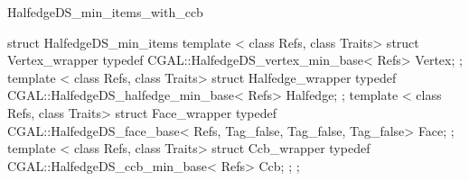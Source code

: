 \begin{ccRefClass}{HalfedgeDS_min_items_with_ccb}
\begin{ccExampleCode}
struct HalfedgeDS_min_items {
    template < class Refs, class Traits>
    struct Vertex_wrapper {
        typedef CGAL::HalfedgeDS_vertex_min_base< Refs>   Vertex;
    };
    template < class Refs, class Traits>
    struct Halfedge_wrapper {
        typedef CGAL::HalfedgeDS_halfedge_min_base< Refs> Halfedge;
    };
    template < class Refs, class Traits>
    struct Face_wrapper {
        typedef CGAL::HalfedgeDS_face_base< Refs, Tag_false, Tag_false, Tag_false> Face;
    };
    template < class Refs, class Traits>
    struct Ccb_wrapper {
        typedef CGAL::HalfedgeDS_ccb_min_base< Refs>  Ccb;
    };
};
\end{ccExampleCode}

\end{ccRefClass}

\ccRefPageEnd

